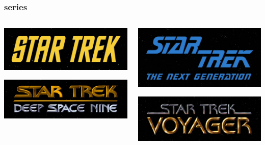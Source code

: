 \documentclass{beamer}
\begin{document}
\begin{frame}
  \frametitle{series}
  \begin{columns}
    \begin{column}{0.5\textwidth}
      \includegraphics[width = \textwidth, keepaspectratio = true]{figure/tos}

      \vspace{1cm}

      \includegraphics[width = \textwidth, keepaspectratio = true]{figure/ds9}
    \end{column}
    \begin{column}{0.5\textwidth}
      \includegraphics[width = \textwidth, keepaspectratio = true]{figure/tng}

      \vspace{0.5cm}

      \includegraphics[width = \textwidth, keepaspectratio = true]{figure/voy}
    \end{column}
  \end{columns}
\end{frame}
\end{document}
